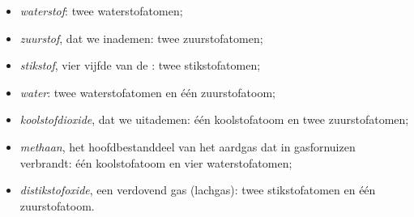 \begin{example}\label{ex:g7:atoms-and-molecules:seven}
\begin{itemize}
  \item \emph{waterstof}: twee waterstofatomen;
  \item \emph{zuurstof}, dat we inademen: twee zuurstofatomen;
  \item \emph{stikstof}, vier vijfde van de : twee
        stikstofatomen;
  \item \emph{water}: twee waterstofatomen en één zuurstofatoom;
  \item \emph{koolstofdioxide}, dat we uitademen: één koolstofatoom en
        twee zuurstofatomen;
  \item \emph{methaan}, het hoofdbestanddeel van het aardgas dat in
        gasfornuizen verbrandt: één koolstofatoom en vier
        waterstofatomen;
  \item \emph{distikstofoxide}, een verdovend gas (lachgas):
        twee stikstofatomen en één zuurstofatoom.
\end{itemize}
\end{example}

